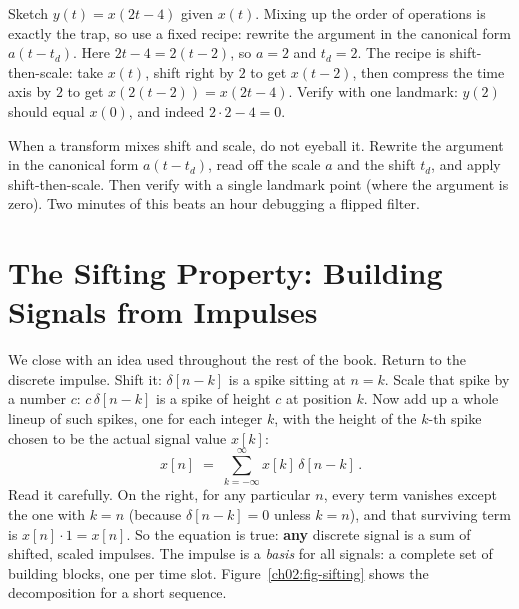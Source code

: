 \begin{example}
\label{ch02:ex-compound}
Sketch $y(t) = x(2t - 4)$ given $x(t)$. Mixing up the order of operations is exactly
the trap, so use a fixed recipe: rewrite the argument in the canonical form
$a(t - t_d)$. Here $2t - 4 = 2(t - 2)$, so $a = 2$ and $t_d = 2$. The recipe is
shift-then-scale: take $x(t)$, shift right by $2$ to get $x(t-2)$, then compress the
time axis by $2$ to get $x(2(t-2)) = x(2t-4)$. Verify with one landmark: $y(2)$
should equal $x(0)$, and indeed $2\cdot 2 - 4 = 0$.~\checkmark
\end{example}

\begin{trapbox}
When a transform mixes shift and scale, do not eyeball it. Rewrite the argument in
the canonical form $a(t - t_d)$, read off the scale $a$ and the shift $t_d$, and
apply shift-then-scale. Then verify with a single landmark point (where the
argument is zero). Two minutes of this beats an hour debugging a flipped filter.
\end{trapbox}

\section{The Sifting Property: Building Signals from Impulses}
\label{ch02:sifting}

We close with an idea used throughout the rest of the book. Return to the
discrete impulse. Shift it: $\delta[n-k]$ is a spike sitting at $n=k$. Scale that
spike by a number $c$: $c\,\delta[n-k]$ is a spike of height $c$ at position $k$.
Now add up a whole lineup of such spikes, one for each integer $k$, with the height
of the $k$-th spike chosen to be the actual signal value $x[k]$:
\[
  \boxed{\,x[n] \;=\; \sum_{k=-\infty}^{\infty} x[k]\,\delta[n-k]\,}.
\]
Read it carefully. On the right, for any particular $n$, every term vanishes except
the one with $k = n$ (because $\delta[n-k]=0$ unless $k=n$), and that surviving term
is $x[n]\cdot 1 = x[n]$. So the equation is true: \textbf{any} discrete signal is a sum of shifted, scaled impulses. The
impulse is a \emph{basis} for all signals: a complete set of building blocks, one
per time slot. Figure~\ref{ch02:fig-sifting} shows the decomposition for a short
sequence.

